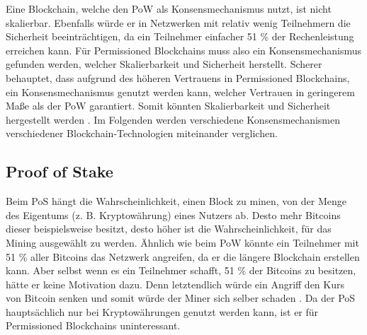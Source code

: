 Eine Blockchain, welche den \acs{PoW} als Konsensmechanismus nutzt, ist nicht skalierbar. Ebenfalls würde er in Netzwerken mit relativ wenig Teilnehmern die Sicherheit beeinträchtigen, da ein Teilnehmer einfacher 51 \% der Rechenleistung erreichen kann. Für Permissioned Blockchains muss also ein Konsensmechanismus gefunden werden, welcher Skalierbarkeit und Sicherheit herstellt. Scherer behauptet, dass aufgrund des höheren Vertrauens in Permissioned Blockchains, ein Konsensmechanismus genutzt werden kann, welcher Vertrauen in geringerem Maße als der \acs{PoW} garantiert. Somit könnten Skalierbarkeit und Sicherheit hergestellt werden \cite{SchererPerformanceScalabilityBlockchain2017}. Im Folgenden werden verschiedene Konsensmechanismen verschiedener Blockchain-Technologien miteinander verglichen.

\subsection{Proof of Stake}
Beim PoS hängt die Wahrscheinlichkeit, einen Block zu minen, von der Menge des Eigentums (z. B. Kryptowährung) eines Nutzers ab. Desto mehr Bitcoins dieser beispielsweise besitzt, desto höher ist die Wahrscheinlichkeit, für das Mining ausgewählt zu werden. Ähnlich wie beim \acs{PoW} könnte ein Teilnehmer mit 51 \% aller Bitcoins das Netzwerk angreifen, da er die längere Blockchain erstellen kann. Aber selbst wenn es ein Teilnehmer schafft, 51 \% der Bitcoins zu besitzen, hätte er keine Motivation dazu. Denn letztendlich würde ein Angriff den Kurs von Bitcoin senken und somit würde der Miner sich selber schaden \cite{ZhengBlockchainChallengesOpportunities2017}. Da der PoS hauptsächlich nur bei Kryptowährungen genutzt werden kann, ist er für Permissioned Blockchains uninteressant.


